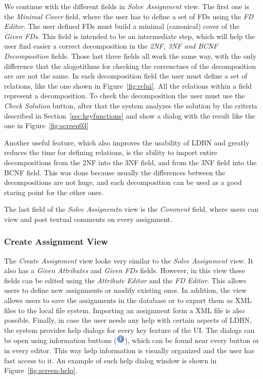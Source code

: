 We continue with the different fields in \textit{Solve Assignment} view. 
The first one is the \textit{Minimal Cover} field, where the user has to define 
a set of FDs using the \textit{FD Editor}. The user defined FDs must
build a minimal (canonical) cover of the \textit{Given FDs}.
This field is intended to be an intermediate step, which will help the user 
find easier a correct decomposition
in the \textit{2NF, 3NF and BCNF Decomposition} fields. Those last three fields all
work the same way, with the only difference that the alogotithms for checking the 
correnctnes of the 
decomposition are are not the same.  
In each decomposition field the user must define a set of relations, like the one shown 
in Figure~\ref{fig:relui}. All the relations
within a field represent a decomposition. To check the decomposition the user must
use the \textit{Check Solution} button, 
after that the system analyzes the solution by the criteria described in 
Section~\ref{sec:keyfunctions} and show a dialog with the result 
like the one in Figure~\ref{fig:screen03} 

Another useful feature, which also improves the usability of LDBN and greatly reduces
the time for defining relations, 
is the ability to 
import entire decompositions from the 2NF into the 3NF field, and from the 
3NF field into the BCNF field. This was done because usually 
the differences between the decompositions are not huge, and each decomposition
can be used as a good staring point for the other ones.	

The last field of the \textit{Solve Assignemtn} view is the \textit{Comment} field, 
where users can view and post textual comments on every assignment.

\subsubsection{Create Assignment View}
The \textit{Create Assignment} view looks very similar to the 
\textit{Solve Assignment} view. It also has a \textit{Given Attributes} and 
\textit{Given FDs} fields. However, in this view these fields
can be edited using the \textit{Attribute Editor} and the \textit{FD Editor}. 
This allows users to define new assignments or modify existing ones. In addition, the view
allows users to save the assignments in the database or to export them as XML
files to the local file system. Importing an assignment form a XML file is also 
possible.  
\newline
Finally, in case the user needs any help with certain aspects of LDBN, the system provides 
help dialogs for every key feature of the UI. The dialogs can be open
using information buttons (\includegraphics[scale=0.5]{./img/info.png}), which can be
found near every button or in every editor. This way help information is 
visually organized and the user has fast access to it. An example of such help dialog
window is shown in Figure~\ref{fig:screen-help}.


